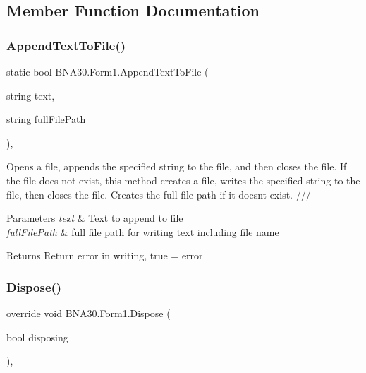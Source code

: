 \subsection{Member Function Documentation}
\mbox{\label{class_b_n_a30_1_1_form1_a8ab552e073dad815b5b7cfb57b62784e}} 
\subsubsection{\texorpdfstring{AppendTextToFile()}{AppendTextToFile()}}
{\footnotesize\ttfamily static bool B\+N\+A30.\+Form1.\+Append\+Text\+To\+File (\begin{DoxyParamCaption}\item[{string}]{text,  }\item[{string}]{full\+File\+Path }\end{DoxyParamCaption})\hspace{0.3cm}{\ttfamily [inline]}, {\ttfamily [static]}}



Opens a file, appends the specified string to the file, and then closes the file. If the file does not exist, this method creates a file, writes the specified string to the file, then closes the file. Creates the full file path if it doesn\textquotesingle{}t exist. /// 


\begin{DoxyParams}{Parameters}
{\em text} & Text to append to file\\
\hline
{\em full\+File\+Path} & full file path for writing text including file name\\
\hline
\end{DoxyParams}
\begin{DoxyReturn}{Returns}
Return error in writing, true = error 
\end{DoxyReturn}
\mbox{\label{class_b_n_a30_1_1_form1_a3119d1007891ede1ab3020be53626fe9}} 
\subsubsection{\texorpdfstring{Dispose()}{Dispose()}}
{\footnotesize\ttfamily override void B\+N\+A30.\+Form1.\+Dispose (\begin{DoxyParamCaption}\item[{bool}]{disposing }\end{DoxyParamCaption})\hspace{0.3cm}{\ttfamily [inline]}, {\ttfamily [protected]}}



